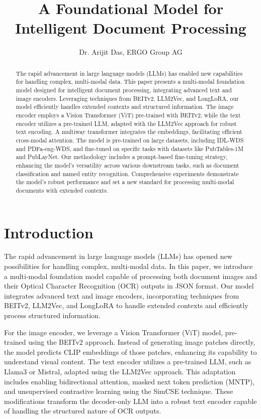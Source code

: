 \documentclass{article}
\begin{document}
\title{A Foundational Model for Intelligent Document Processing}
\author{Dr. Arijit Das, ERGO Group AG}
\maketitle

\begin{abstract}
    The rapid advancement in large language models (LLMs) has enabled new capabilities for handling complex, multi-modal data. This paper presents a multi-modal foundation model designed for intelligent document processing, integrating advanced text and image encoders. Leveraging techniques from BEITv2, LLM2Vec, and LongLoRA, our model efficiently handles extended contexts and structured information. The image encoder employs a Vision Transformer (ViT) pre-trained with BEITv2, while the text encoder utilizes a pre-trained LLM, adapted with the LLM2Vec approach for robust text encoding. A multiway transformer integrates the embeddings, facilitating efficient cross-modal attention. The model is pre-trained on large datasets, including IDL-WDS and PDFa-eng-WDS, and fine-tuned on specific tasks with datasets like PubTables-1M and PubLayNet. Our methodology includes a prompt-based fine-tuning strategy, enhancing the model's versatility across various downstream tasks, such as document classification and named entity recognition. Comprehensive experiments demonstrate the model's robust performance and set a new standard for processing multi-modal documents with extended contexts.
\end{abstract}

\section{Introduction}

The rapid advancement in large language models (LLMs) has opened new possibilities for handling complex, multi-modal data. In this paper, we introduce a multi-modal foundation model capable of processing both document images and their Optical Character Recognition (OCR) outputs in JSON format. Our model integrates advanced text and image encoders, incorporating techniques from BEITv2, LLM2Vec, and LongLoRA to handle extended contexts and efficiently process structured information.

For the image encoder, we leverage a Vision Transformer (ViT) model, pre-trained using the BEITv2 approach. Instead of generating image patches directly, the model predicts CLIP embeddings of those patches, enhancing its capability to understand visual content. The text encoder utilizes a pre-trained LLM, such as Llama3 or Mistral, adapted using the LLM2Vec approach. This adaptation includes enabling bidirectional attention, masked next token prediction (MNTP), and unsupervised contrastive learning using the SimCSE technique. These modifications transform the decoder-only LLM into a robust text encoder capable of handling the structured nature of OCR outputs.
\end{document}
